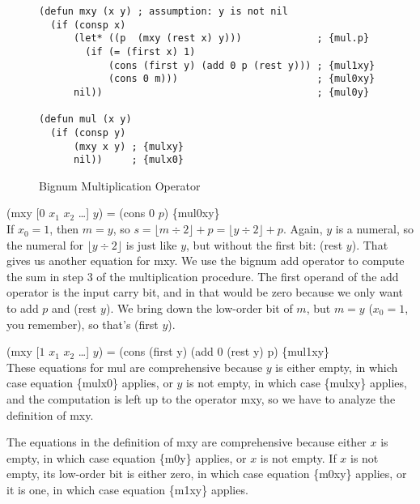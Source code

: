 \begin{figure}
\begin{Verbatim}
(defun mxy (x y) ; assumption: y is not nil
  (if (consp x)
      (let* ((p  (mxy (rest x) y)))             ; {mul.p}
        (if (= (first x) 1)
            (cons (first y) (add 0 p (rest y))) ; {mul1xy}
            (cons 0 m)))                        ; {mul0xy}
      nil))                                     ; {mul0y}

(defun mul (x y)
  (if (consp y)
      (mxy x y) ; {mulxy}
      nil))     ; {mulx0}
\end{Verbatim}
\label{bignum-mul-defun}
\caption{Bignum Multiplication Operator}
\label{fig:bignum-mul-defun}
\end{figure}

\hspace*{2cm} (mxy [$0$ $x_1$ $x_2$ \dots] $y$) = (cons $0$ $p$) \hfill \{mul0xy\}
\\

If $x_0 = 1$, then $m = y$,
so $s = \lfloor m\div 2\rfloor + p = \lfloor y\div 2\rfloor + p$.
Again, $y$ is a numeral, so the numeral for $\lfloor y\div 2\rfloor$
is just like $y$, but without the first bit: (rest $y$).
That gives us another equation for mxy.
We use the bignum add operator to compute the sum in step 3
of the multiplication procedure. 
The first operand of the add operator is the input carry bit,
and in that would be zero because we only want to add $p$ and (rest $y$).
We bring down the low-order bit of $m$, but $m = y$
($x_0 = 1$, you remember), so that's (first $y$).

\hspace*{2cm} (mxy [$1$ $x_1$ $x_2$ \dots] $y$) = (cons (first y) (add 0 (rest y) p) \hfill \{mul1xy\}
\\

These equations for mul are comprehensive because $y$ is either empty,
in which case equation \{mulx0\} applies,
or $y$ is not empty, in which case \{mulxy\} applies, and
the computation is left up to the operator mxy,
so we have to analyze the definition of mxy.

The equations in the definition of mxy are comprehensive 
because either $x$ is empty, in which case
equation \{m0y\} applies, or $x$ is not empty.
If $x$ is not empty, its low-order bit is either zero,
in which case equation \{m0xy\} applies, or it is one,
in which case equation \{m1xy\} applies.

